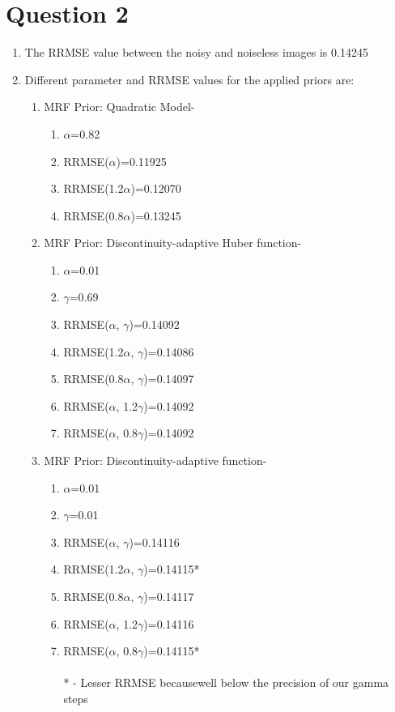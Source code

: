 \documentclass[12pt]{article}
\theoremstyle{definition}
\numberwithin{thm}{section}
\begin{document}
\section{Question 2}
\begin{enumerate}[label=(\alph*)]
\item The RRMSE value between the noisy and noiseless images is 0.14245
\item Different parameter and RRMSE values for the applied priors are:
\begin{enumerate}[label=(\arabic*)]
\item MRF Prior: Quadratic Model-
	\begin{enumerate}
		\item $\alpha$=0.82 
		\item RRMSE($\alpha$)=0.11925
		\item RRMSE(1.2$\alpha$)=0.12070
		\item RRMSE(0.8$\alpha$)=0.13245
	\end{enumerate}
	\item MRF Prior: Discontinuity-adaptive Huber function-
	\begin{enumerate}
		\item $\alpha$=0.01
		\item $\gamma$=0.69 
		\item RRMSE($\alpha$, $\gamma$)=0.14092
		\item RRMSE(1.2$\alpha$, $\gamma$)=0.14086
		\item RRMSE(0.8$\alpha$, $\gamma$)=0.14097
		\item RRMSE($\alpha$, 1.2$\gamma$)=0.14092
		\item RRMSE($\alpha$, 0.8$\gamma$)=0.14092
	\end{enumerate}
	\item MRF Prior: Discontinuity-adaptive function-
	\begin{enumerate}
		\item $\alpha$=0.01 
		\item $\gamma$=0.01
		\item RRMSE($\alpha$, $\gamma$)=0.14116
		\item RRMSE(1.2$\alpha$, $\gamma$)=0.14115*
		\item RRMSE(0.8$\alpha$, $\gamma$)=0.14117
		\item RRMSE($\alpha$, 1.2$\gamma$)=0.14116
		\item RRMSE($\alpha$, 0.8$\gamma$)=0.14115*\\\\
		\hfill\small{* - Lesser RRMSE becausewell below the precision of our gamma steps}

\end{enumerate}
\end{enumerate}
\end{enumerate}
\end{document}
